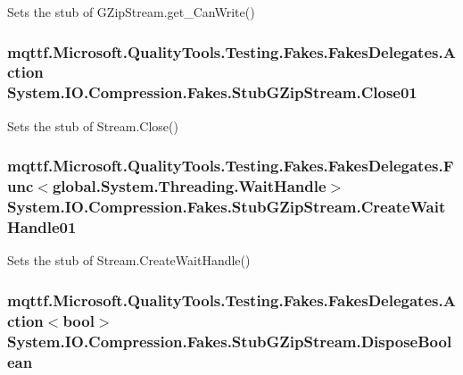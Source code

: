 Sets the stub of G\-Zip\-Stream.\-get\-\_\-\-Can\-Write()

\hypertarget{class_system_1_1_i_o_1_1_compression_1_1_fakes_1_1_stub_g_zip_stream_a3f31b867772b6e51270881976e54425c}{
\subsubsection[{Close01}]{\setlength{\rightskip}{0pt plus 5cm}mqttf.\-Microsoft.\-Quality\-Tools.\-Testing.\-Fakes.\-Fakes\-Delegates.\-Action System.\-I\-O.\-Compression.\-Fakes.\-Stub\-G\-Zip\-Stream.\-Close01}}\label{class_system_1_1_i_o_1_1_compression_1_1_fakes_1_1_stub_g_zip_stream_a3f31b867772b6e51270881976e54425c}


Sets the stub of Stream.\-Close()

\hypertarget{class_system_1_1_i_o_1_1_compression_1_1_fakes_1_1_stub_g_zip_stream_aa3c6b4e76d21fcfa2cbbc624a8498d27}{
\subsubsection[{Create\-Wait\-Handle01}]{\setlength{\rightskip}{0pt plus 5cm}mqttf.\-Microsoft.\-Quality\-Tools.\-Testing.\-Fakes.\-Fakes\-Delegates.\-Func$<$global.\-System.\-Threading.\-Wait\-Handle$>$ System.\-I\-O.\-Compression.\-Fakes.\-Stub\-G\-Zip\-Stream.\-Create\-Wait\-Handle01}}\label{class_system_1_1_i_o_1_1_compression_1_1_fakes_1_1_stub_g_zip_stream_aa3c6b4e76d21fcfa2cbbc624a8498d27}


Sets the stub of Stream.\-Create\-Wait\-Handle()

\hypertarget{class_system_1_1_i_o_1_1_compression_1_1_fakes_1_1_stub_g_zip_stream_a4837dfa37f8af23d6b6eaac8dc873758}{
\subsubsection[{Dispose\-Boolean}]{\setlength{\rightskip}{0pt plus 5cm}mqttf.\-Microsoft.\-Quality\-Tools.\-Testing.\-Fakes.\-Fakes\-Delegates.\-Action$<$bool$>$ System.\-I\-O.\-Compression.\-Fakes.\-Stub\-G\-Zip\-Stream.\-Dispose\-Boolean}}\label{class_system_1_1_i_o_1_1_compression_1_1_fakes_1_1_stub_g_zip_stream_a4837dfa37f8af23d6b6eaac8dc873758}


